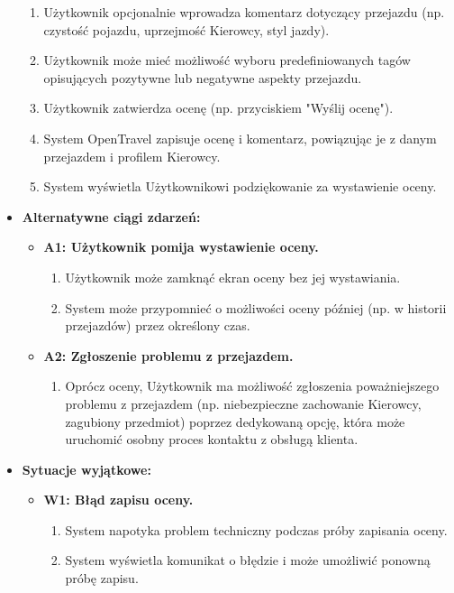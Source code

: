 \documentclass[a4paper,12pt]{article}
\begin{document}
\begin{itemize}
\begin{enumerate}
            \item Użytkownik opcjonalnie wprowadza komentarz dotyczący przejazdu (np. czystość pojazdu, uprzejmość Kierowcy, styl jazdy).
            \item Użytkownik może mieć możliwość wyboru predefiniowanych tagów opisujących pozytywne lub negatywne aspekty przejazdu.
            \item Użytkownik zatwierdza ocenę (np. przyciskiem "Wyślij ocenę").
            \item System OpenTravel zapisuje ocenę i komentarz, powiązując je z danym przejazdem i profilem Kierowcy.
            \item System wyświetla Użytkownikowi podziękowanie za wystawienie oceny.
        \end{enumerate}
    \item \textbf{Alternatywne ciągi zdarzeń:}
        \begin{itemize}
            \item \textbf{A1: Użytkownik pomija wystawienie oceny.}
                \begin{enumerate}
                    \item Użytkownik może zamknąć ekran oceny bez jej wystawiania.
                    \item System może przypomnieć o możliwości oceny później (np. w historii przejazdów) przez określony czas.
                \end{enumerate}
            \item \textbf{A2: Zgłoszenie problemu z przejazdem.}
                 \begin{enumerate}
                    \item Oprócz oceny, Użytkownik ma możliwość zgłoszenia poważniejszego problemu z przejazdem (np. niebezpieczne zachowanie Kierowcy, zagubiony przedmiot) poprzez dedykowaną opcję, która może uruchomić osobny proces kontaktu z obsługą klienta.
                \end{enumerate}
        \end{itemize}
    \item \textbf{Sytuacje wyjątkowe:}
        \begin{itemize}
            \item \textbf{W1: Błąd zapisu oceny.}
                \begin{enumerate}
                    \item System napotyka problem techniczny podczas próby zapisania oceny.
                    \item System wyświetla komunikat o błędzie i może umożliwić ponowną próbę zapisu.
                \end{enumerate}
        \end{itemize}
\end{itemize}
\end{document}
